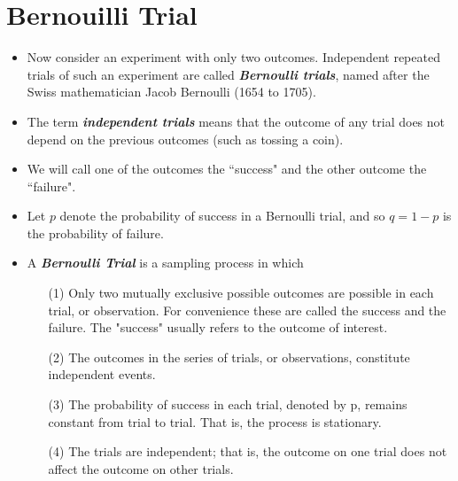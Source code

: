 \documentclass[a4paper,12pt]{article}
\begin{document}
\section*{Bernouilli Trial}
\begin{itemize}
\item Now consider an experiment with only two outcomes. Independent repeated trials of such an experiment are
called \textbf{\textit{Bernoulli trials}}, named after the Swiss mathematician Jacob Bernoulli (1654 to 1705). \item The term \textbf{\emph{independent
trials}} means that the outcome of any trial does not depend on the previous outcomes (such as tossing a coin).
\item We will call one of the outcomes the ``success" and the other outcome the ``failure".
\item
Let $p$ denote the probability of success in a Bernoulli trial, and so $q = 1 - p$ is the probability of failure.


\item A \textbf{\textit{Bernoulli
Trial}} is a sampling process in which
\begin{itemize}
	\item[(1)] Only two mutually exclusive possible outcomes are possible in each trial, or observation. For
	convenience these are called the success and the failure. The "success" usually refers to the outcome of interest.
	\item[(2)] The outcomes in the series of trials, or observations, constitute independent events.
	\item[(3)] The probability of success in each trial, denoted by p, remains constant from trial to trial. That is,
	the process is stationary.
	\item[(4)] The trials are independent; that is, the outcome on one trial does not affect the outcome on other trials.
\end{itemize}
\end{itemize}
\end{document}
